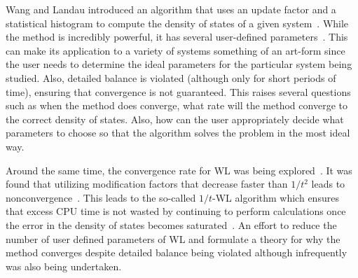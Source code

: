 \documentclass[letterpaper,twocolumn,amsmath,amssymb,pre,aps,10pt]{revtex4-1}
\begin{document}
Wang and Landau introduced an algorithm that uses an update factor and
a statistical histogram to compute the density of states of a given
system~\cite{wang2001determining, wang2001efficient}.  While the method
is incredibly powerful, it has several user-defined
parameters~\cite{landau2004new}.  This can make its application to a
variety of systems something of an art-form since the user needs to
determine the ideal parameters for the particular system being studied.
Also, detailed balance is violated (although only for short periods of
time), ensuring that convergence is not guaranteed.  This raises
several questions such as when the method does converge, what rate will
the method converge to the correct density of states. Also, how can the
user appropriately decide what parameters to choose so that the
algorithm solves the problem in the most ideal way.

%
Around the same time, the convergence rate for WL was being
explored~\cite{zhou2005understanding,lee2006convergence,
belardinelli2007wang}. It was found that utilizing modification factors
that decrease faster than $1/t^2$ leads to
nonconvergence~\cite{belardinelli2007fast}.  This leads to the so-called
$1/t$-WL algorithm which ensures that excess CPU time is not wasted by
continuing to perform calculations once the error in the density of
states becomes saturated~\cite{belardinelli2008analysis}. An effort to
reduce the number of user defined parameters of WL and formulate a
theory for why the method converges despite detailed balance being
violated although infrequently was also being undertaken.
\end{document}
